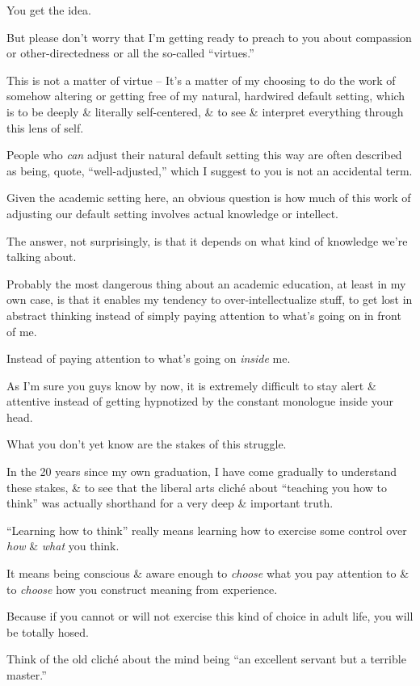\documentclass{article}
\begin{document}
You get the idea.

But please don't worry that I'm getting ready to preach to you about compassion or other-directedness or all the so-called ``virtues.''

This is not a matter of virtue -- It's a matter of my choosing to do the work of somehow altering or getting free of my natural, hardwired default setting, which is to be deeply \& literally self-centered, \& to see \& interpret everything through this lens of self.

People who {\it can} adjust their natural default setting this way are often described as being, quote, ``well-adjusted,'' which I suggest to you is not an accidental term.

Given the academic setting here, an obvious question is how much of this work of adjusting our default setting involves actual knowledge or intellect.

The answer, not surprisingly, is that it depends on what kind of knowledge we're talking about.

Probably the most dangerous thing about an academic education, at least in my own case, is that it enables my tendency to over-intellectualize stuff, to get lost in abstract thinking instead of simply paying attention to what's going on in front of me.

Instead of paying attention to what's going on {\it inside} me.

As I'm sure you guys know by now, it is extremely difficult to stay alert \& attentive instead of getting hypnotized by the constant monologue inside your head.

What you don't yet know are the stakes of this struggle.

In the 20 years since my own graduation, I have come gradually to understand these stakes, \& to see that the liberal arts clich\'e about ``teaching you how to think'' was actually shorthand for a very deep \& important truth.

``Learning how to think'' really means learning how to exercise some control over {\it how} \& {\it what} you think.

It means being conscious \& aware enough to {\it choose} what you pay attention to \& to {\it choose} how you construct meaning from experience.

Because if you cannot or will not exercise this kind of choice in adult life, you will be totally hosed.

Think of the old clich\'e about the mind being ``an excellent servant but a terrible master.''
\end{document}
